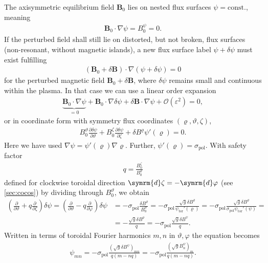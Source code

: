 \documentclass[a4paper, twoside, 10pt, english]{article}
\numberwithin{equation}{section}
\let\temp\varrho
\let\varrho\rho
\let\rho\temp
\let\temp\vartheta
\let\vartheta\theta
\let\theta\temp
\let\temp\varphi
\let\varphi\phi
\let\phi\temp
\let\vec\symbf
\newcommand*\grad{\ensuremath{\nabla}}
\newcommand*\diff{\ensuremath{\symrm{d}}}  %
\newcommand*\pd[2][]{\ensuremath{\frac{\partial #1}{\partial #2}}}  %
\newcommand*\pol{\ensuremath{\textrm{pol}}}  %
\newcommand*\tor{\ensuremath{\textrm{tor}}}  %
\newcommand*\Bpert{\ensuremath{\delta \vec{B}}}  %
\begin{document}
The axisymmetric equilibrium field $\vec{B}_{0}$ lies on nested flux surfaces $\psi = \text{const.}$, meaning
\begin{gather*}
  \vec{B}_{0} \cdot \grad \psi = B_{0}^{\psi} = 0.
\end{gather*}
If the perturbed field shall still lie on distorted, but not broken, flux surfaces (non-resonant, without magnetic islands), a new flux surface label $\psi + \delta \psi$ must exist fulfilling
\begin{gather*}
  (\vec{B}_{0} + \Bpert) \cdot \grad (\psi + \delta \psi) = 0
\end{gather*}
for the perturbed magnetic field $\vec{B}_{0} + \Bpert$, where $\delta \psi$ remains small and continuous within the plasma. In that case we can use a linear order expansion
\begin{gather*}
  \underbrace{\vec{B}_{0} \cdot \grad \psi}_{= 0} + \vec{B}_{0} \cdot \grad \delta \psi + \Bpert \cdot \grad \psi + \mathcal{O}(\varepsilon^{2}) = 0,
\end{gather*}
or in coordinate form with symmetry flux coordinates $(\rho, \theta, \zeta)$,
\begin{gather*}
  B_{0}^{\theta} \pd[\delta \psi]{\theta} + B_{0}^{\zeta} \pd[\delta \psi]{\zeta} + \delta B^{\rho} \psi' (\rho) = 0.
\end{gather*}
Here we have used $\grad \psi = \psi' (\rho) \grad \rho$. Further, $\psi' (\rho) = \sigma_{\pol}$. With safety factor
\begin{gather*}
  q = \frac{B_{0}^{\zeta}}{B_{0}^{\theta}}
\end{gather*}
defined for clockwise toroidal direction $\diff \zeta = -\diff \phi$ (see \cref{sec:cocos}) by dividing through $B_{0}^{\theta}$, we obtain
\begin{align*}
  \left( \pd{\theta} + q \pd{\zeta} \right) \delta \psi = \left( \pd{\theta} - q \pd{\phi} \right) \delta \psi &= -\sigma_{\pol} \frac{\delta B^{\rho}}{B_{0}^{\theta}} = -\sigma_{\pol} \frac{\sqrt{g} \delta B^{\rho}}{\psi_{\tor}' (\rho)} = -\sigma_{\pol} \frac{\sqrt{g} \delta B^{\rho}}{\sigma_{\pol} \psi_{\tor}' (\psi)} = \\
  &= -\frac{\sqrt{g} \delta B^{\rho}}{q} = -\sigma_{\pol} \frac{\sqrt{g} \delta B^{\psi}}{q}.
\end{align*}
Written in terms of toroidal Fourier harmonics $m, n$ in $\theta, \phi$ the equation becomes
\begin{gather*}
  \psi_{m n} = -\sigma_{\pol} \frac{\left( \sqrt{g} \delta B^{\psi} \right)_{m n}}{q (m - n q)} = -\sigma_{\pol} \frac{\left( \sqrt{g} B_{n}^{\psi} \right)_{m}}{q (m - n q)}.
\end{gather*}
\end{document}
